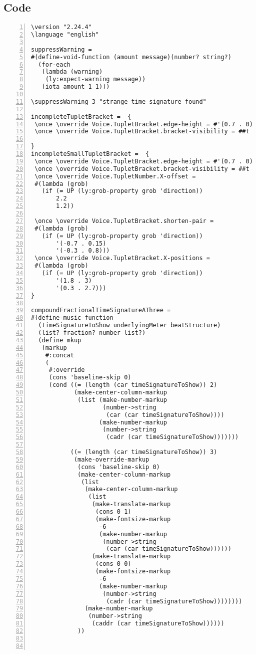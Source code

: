 \subsection{Code}
\begin{Verbatim}[numbers=left,xleftmargin=5mm]
\version "2.24.4"
\language "english"

suppressWarning =
#(define-void-function (amount message)(number? string?)
  (for-each
   (lambda (warning)
    (ly:expect-warning message))
   (iota amount 1 1)))

\suppressWarning 3 "strange time signature found"

incompleteTupletBracket =  {
 \once \override Voice.TupletBracket.edge-height = #'(0.7 . 0)
 \once \override Voice.TupletBracket.bracket-visibility = ##t

}
incompleteSmallTupletBracket =  {
 \once \override Voice.TupletBracket.edge-height = #'(0.7 . 0)
 \once \override Voice.TupletBracket.bracket-visibility = ##t
 \once \override Voice.TupletNumber.X-offset =
 #(lambda (grob)
   (if (= UP (ly:grob-property grob 'direction))
       2.2
       1.2))

 \once \override Voice.TupletBracket.shorten-pair =
 #(lambda (grob)
   (if (= UP (ly:grob-property grob 'direction))
       '(-0.7 . 0.15)
       '(-0.3 . 0.8)))
 \once \override Voice.TupletBracket.X-positions =
 #(lambda (grob)
   (if (= UP (ly:grob-property grob 'direction))
       '(1.8 . 3)
       '(0.3 . 2.7)))
}

compoundFractionalTimeSignatureAThree =
#(define-music-function
  (timeSignatureToShow underlyingMeter beatStructure)
  (list? fraction? number-list?)
  (define mkup
   (markup
    #:concat
    (
     #:override
     (cons 'baseline-skip 0)
     (cond ((= (length (car timeSignatureToShow)) 2)
            (make-center-column-markup
             (list (make-number-markup
                    (number->string
                     (car (car timeSignatureToShow))))
                   (make-number-markup
                    (number->string
                     (cadr (car timeSignatureToShow)))))))

           ((= (length (car timeSignatureToShow)) 3)
            (make-override-markup
             (cons 'baseline-skip 0)
             (make-center-column-markup
              (list
               (make-center-column-markup
                (list
                 (make-translate-markup
                  (cons 0 1)
                  (make-fontsize-markup
                   -6
                   (make-number-markup
                    (number->string
                     (car (car timeSignatureToShow))))))
                 (make-translate-markup
                  (cons 0 0)
                  (make-fontsize-markup
                   -6
                   (make-number-markup
                    (number->string
                     (cadr (car timeSignatureToShow))))))))
               (make-number-markup
                (number->string
                 (caddr (car timeSignatureToShow))))))
             ))



\end{Verbatim}
